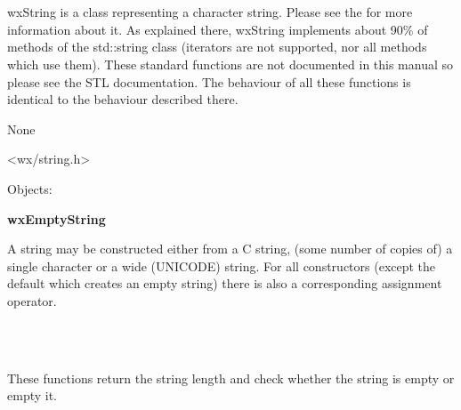 \section{}\label{wxstring}

wxString is a class representing a character string. Please see the 
 for more information about it. As explained
there, wxString implements about 90\% of methods of the std::string class (iterators
are not supported, nor all methods which use them).
These standard functions are not documented in this manual so please see the STL documentation.
The behaviour of all these functions is identical to the behaviour described
there.


None


<wx/string.h>


Objects:

{\bf wxEmptyString}





A string may be constructed either from a C string, (some number of copies of)
a single character or a wide (UNICODE) string. For all constructors (except the
default which creates an empty string) there is also a corresponding assignment
operator.

\\
\\


These functions return the string length and check whether the string is empty
or empty it.

\\
\\
\\
\\

